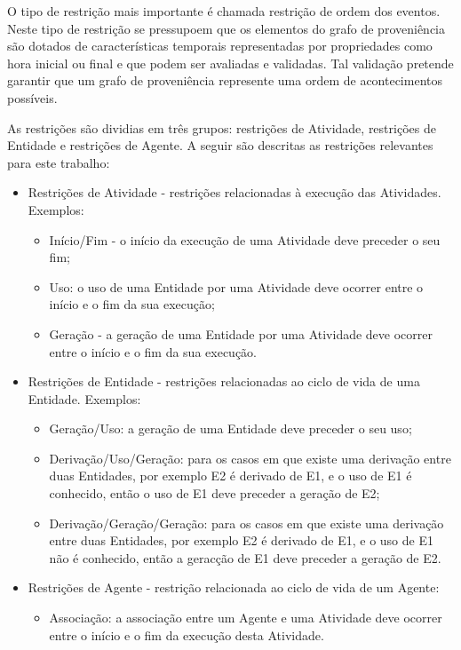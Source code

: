 O tipo de restrição mais importante é chamada restrição de ordem dos eventos. Neste tipo de restrição se pressupoem que os elementos do grafo de proveniência são dotados de características temporais representadas por propriedades como hora inicial ou final e que podem ser avaliadas e validadas. Tal validação pretende garantir que um grafo de proveniência represente uma ordem de acontecimentos possíveis.

As restrições são dividias em três grupos: restrições de Atividade, restrições de Entidade e restrições de Agente.  A seguir são descritas as restrições relevantes para este trabalho:

\begin{itemize}
\item Restrições de Atividade - restrições relacionadas à execução das Atividades. Exemplos:
  \begin{itemize}
    \item Início/Fim - o início da execução de uma Atividade deve preceder o seu fim;
    \item Uso: o uso de uma Entidade por uma Atividade deve ocorrer entre o início e o fim da sua execução;
     \item Geração - a geração de uma Entidade por uma Atividade deve ocorrer entre o início e o fim da sua execução.
  \end{itemize}
\item Restrições de Entidade - restrições relacionadas ao ciclo de vida de uma Entidade. Exemplos:
  \begin{itemize}
    \item Geração/Uso: a geração de uma Entidade deve preceder o seu uso;
    \item Derivação/Uso/Geração: para os casos em que existe uma derivação entre duas Entidades, por exemplo E2 é derivado de E1, e o uso de E1 é conhecido, então o uso de E1 deve preceder a geração de E2;
    \item Derivação/Geração/Geração: para os casos em que existe uma derivação entre duas Entidades, por exemplo E2 é derivado de E1, e o uso de E1 não é conhecido, então a geracção de E1 deve preceder a geração de E2.
  \end{itemize}
\item Restrições de Agente - restrição relacionada ao ciclo de vida de um Agente:
  \begin{itemize}
    \item Associação: a associação entre um Agente e uma Atividade deve ocorrer entre o início e o fim da execução desta Atividade.
  \end{itemize}
\end{itemize}

